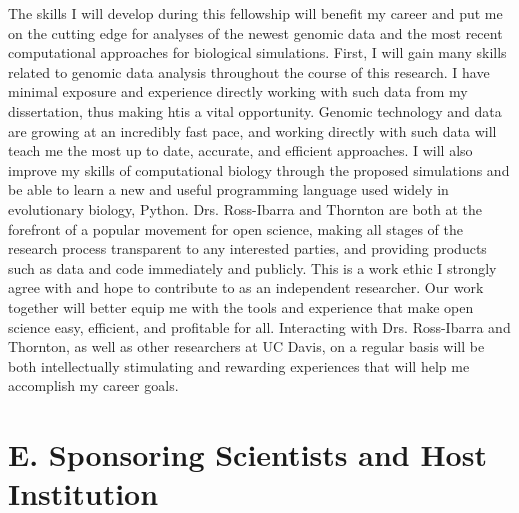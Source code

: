 The skills I will develop during this fellowship will benefit my career and put me on the cutting edge for analyses of the newest genomic data and the most recent computational approaches for biological simulations. First, I will gain many skills related to genomic data analysis throughout the course of this research. I have minimal exposure and experience directly working with such data from my dissertation, thus making htis a vital opportunity. Genomic technology and data are growing at an incredibly fast pace, and working directly with such data will teach me the most up to date, accurate, and efficient approaches. I will also improve my skills of computational biology through the proposed simulations and be able to learn a new and useful programming language used widely in evolutionary biology, Python. Drs. Ross\--Ibarra and Thornton are both at the forefront of a popular  movement for open science, making all stages of the research process transparent to any interested parties, and providing products such as data and code immediately and publicly. This is a work ethic I strongly agree with and hope to contribute to as an independent researcher. Our work together will better equip me with the tools and experience that make open science easy, efficient, and profitable for all. Interacting with Drs. Ross\--Ibarra and Thornton, as well as other researchers at UC Davis, on a regular basis will be both intellectually stimulating and rewarding experiences that will help me accomplish my career goals.


\section*{E. Sponsoring Scientists and Host Institution}

